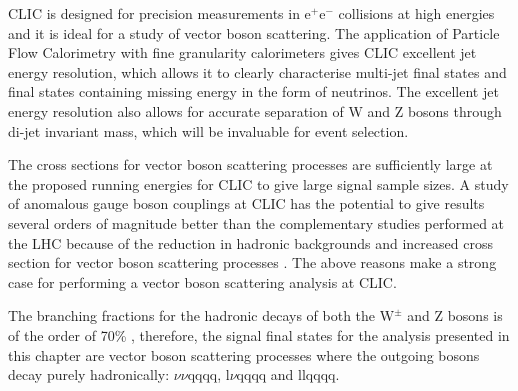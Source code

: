 CLIC is designed for precision measurements in $\text{e}^{+}\text{e}^{-}$ collisions at high energies and it is ideal for a study of vector boson scattering.  The application of Particle Flow Calorimetry with fine granularity calorimeters gives CLIC excellent jet energy resolution, which allows it to clearly characterise multi-jet final states and final states containing missing energy in the form of neutrinos.  The excellent jet energy resolution also allows for accurate separation of W and Z bosons through di-jet invariant mass, which will be invaluable for event selection.  

The cross sections for vector boson scattering processes are sufficiently large at the proposed running energies for CLIC to give large signal sample sizes.  A study of anomalous gauge boson couplings at CLIC has the potential to give results several orders of magnitude better than the complementary studies performed at the LHC because of the reduction in hadronic backgrounds and increased cross section for vector boson scattering processes \cite{Aad:2014zda}.  The above reasons make a strong case for performing a vector boson scattering analysis at CLIC.  

The branching fractions for the hadronic decays of both the $\text{W}^{\pm}$ and Z bosons is of the order of 70\% \cite{Beringer:1900zz}, therefore, the signal final states for the analysis presented in this chapter are vector boson scattering processes where the outgoing bosons decay purely hadronically: $\nu\nu\text{qqqq}$, $\text{l}\nu\text{qqqq}$ and llqqqq.  


